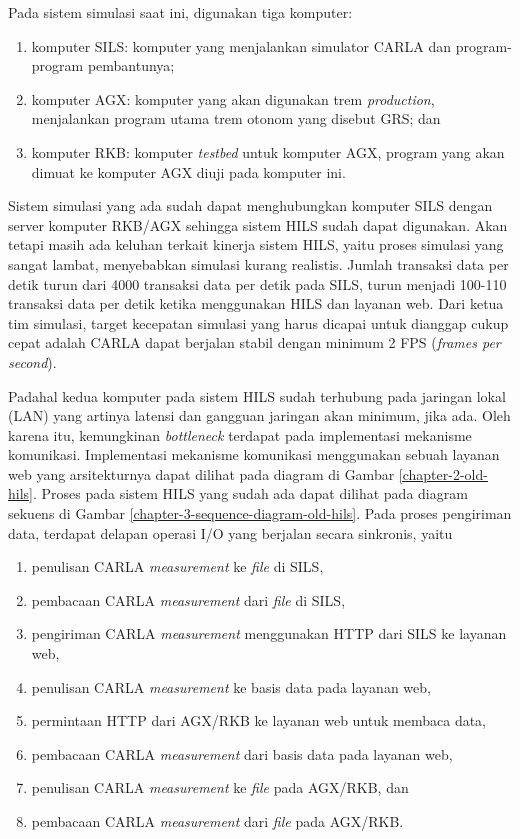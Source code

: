 Pada sistem simulasi saat ini, digunakan tiga komputer:
\begin{enumerate}
	\item komputer SILS: komputer yang menjalankan simulator CARLA dan
	      program-program pembantunya;
	\item komputer AGX: komputer yang akan digunakan trem \textit{production},
	      menjalankan program utama trem otonom yang disebut GRS; dan
	\item komputer RKB: komputer \textit{testbed} untuk komputer  AGX, program
	      yang akan dimuat ke komputer AGX diuji pada komputer ini.
\end{enumerate}

Sistem simulasi yang ada sudah dapat menghubungkan komputer SILS dengan server
komputer RKB/AGX sehingga sistem HILS sudah dapat digunakan. Akan tetapi masih
ada keluhan terkait kinerja sistem HILS, yaitu proses simulasi yang sangat
lambat, menyebabkan simulasi kurang realistis. Jumlah transaksi data per
detik turun dari 4000 transaksi data per detik pada SILS, turun menjadi 100-110
transaksi data per detik ketika menggunakan HILS dan layanan web. Dari ketua tim
simulasi, target kecepatan simulasi yang harus dicapai untuk dianggap cukup
cepat adalah CARLA dapat berjalan stabil dengan minimum 2 FPS (\textit{frames
	per second}).

Padahal kedua komputer pada sistem HILS sudah terhubung pada jaringan lokal
(LAN) yang artinya latensi dan gangguan jaringan akan minimum, jika ada.
Oleh karena itu, kemungkinan \textit{bottleneck} terdapat pada implementasi
mekanisme komunikasi. Implementasi mekanisme komunikasi menggunakan sebuah
layanan web yang arsitekturnya dapat dilihat pada diagram di Gambar
\ref{chapter-2-old-hils}. Proses pada sistem HILS yang sudah ada dapat dilihat
pada diagram sekuens di Gambar \ref{chapter-3-sequence-diagram-old-hils}. Pada
proses pengiriman data, terdapat delapan operasi I/O yang berjalan secara
sinkronis, yaitu
\begin{enumerate}
	\item penulisan CARLA \textit{measurement} ke \textit{file} di SILS,
	\item pembacaan CARLA \textit{measurement} dari \textit{file} di SILS,
	\item pengiriman CARLA \textit{measurement} menggunakan HTTP dari SILS ke
	      layanan web,
	\item penulisan CARLA \textit{measurement} ke basis data pada layanan web,
	\item permintaan HTTP dari AGX/RKB ke layanan web untuk membaca data,
	\item pembacaan CARLA \textit{measurement} dari basis data pada layanan web,
	\item penulisan CARLA \textit{measurement} ke \textit{file} pada AGX/RKB,
	      dan
	\item pembacaan CARLA \textit{measurement} dari \textit{file} pada AGX/RKB.
\end{enumerate}

